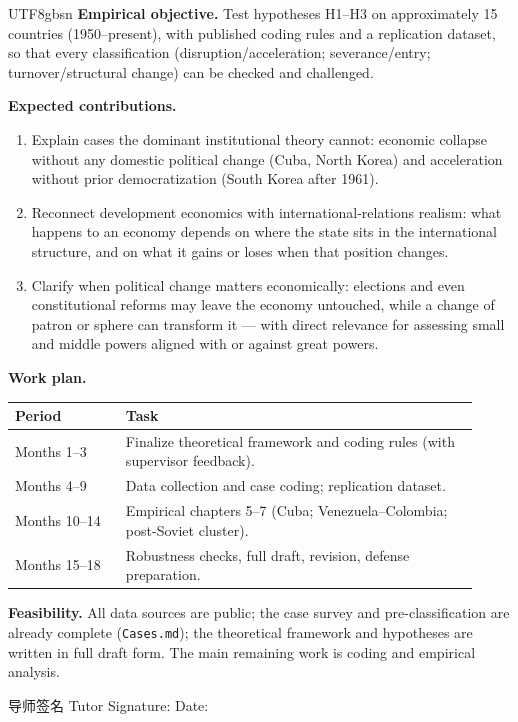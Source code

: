 \documentclass[10pt]{article}
\begin{document}
\begin{CJK}{UTF8}{gbsn}
\noindent\textbf{Empirical objective.} Test hypotheses H1--H3 on approximately 15 countries (1950--present), with published coding rules and a replication dataset, so that every classification (disruption/acceleration; severance/entry; turnover/structural change) can be checked and challenged.

\noindent\textbf{Expected contributions.}
\begin{enumerate}
    \item Explain cases the dominant institutional theory cannot: economic collapse without any domestic political change (Cuba, North Korea) and acceleration without prior democratization (South Korea after 1961).
    \item Reconnect development economics with international-relations realism: what happens to an economy depends on where the state sits in the international structure, and on what it gains or loses when that position changes.
    \item Clarify when political change matters economically: elections and even constitutional reforms may leave the economy untouched, while a change of patron or sphere can transform it --- with direct relevance for assessing small and middle powers aligned with or against great powers.
\end{enumerate}

\noindent\textbf{Work plan.}
\begin{center}\small
\begin{tabular}{p{0.22\linewidth} p{0.70\linewidth}}
\toprule
\textbf{Period} & \textbf{Task} \\
\midrule
Months 1--3 & Finalize theoretical framework and coding rules (with supervisor feedback). \\
Months 4--9 & Data collection and case coding; replication dataset. \\
Months 10--14 & Empirical chapters 5--7 (Cuba; Venezuela--Colombia; post-Soviet cluster). \\
Months 15--18 & Robustness checks, full draft, revision, defense preparation. \\
\bottomrule
\end{tabular}
\end{center}

\noindent\textbf{Feasibility.} All data sources are public; the case survey and pre-classification are already complete (\texttt{Cases.md}); the theoretical framework and hypotheses are written in full draft form. The main remaining work is coding and empirical analysis.

\vspace{24pt}


\vspace{180pt}

\noindent 导师签名 Tutor Signature: \hrulefill\hspace{24pt}Date: \hrulefill

\end{CJK}
\end{document}
